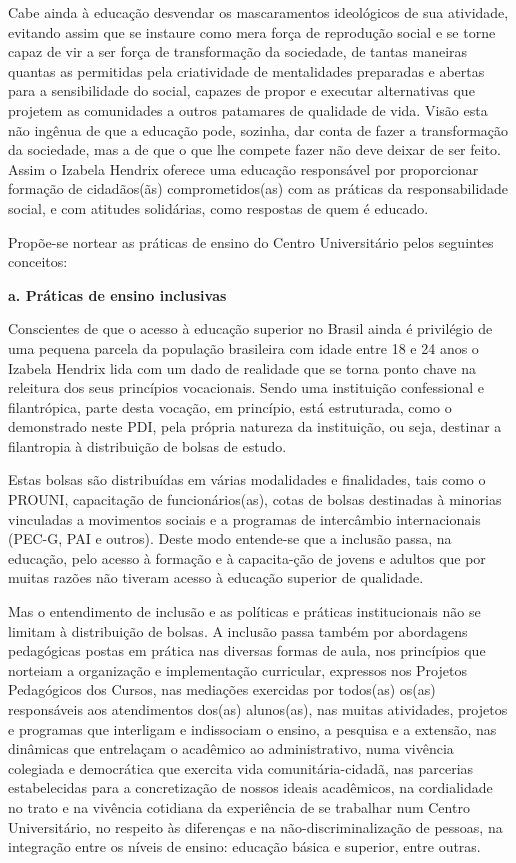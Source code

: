 \documentclass[a4paper, 12pt, openright, oneside, german, french, english, brazil]{abntex2}
\begin{document}
Cabe ainda à educação desvendar os mascaramentos ideológicos de sua atividade, evitando assim que se instaure como mera força de reprodução social e se torne capaz de vir a ser força de transformação da sociedade, de tantas maneiras quantas as permitidas pela criatividade de mentalidades preparadas e abertas para a sensibilidade do social, capazes de propor e executar alternativas que projetem as comunidades a outros patamares de qualidade de vida. Visão esta não ingênua de que a educação pode, sozinha, dar conta de fazer a transformação da sociedade, mas a de que o que lhe compete fazer não deve deixar de ser feito. Assim o Izabela Hendrix oferece uma educação responsável por proporcionar formação de cidadãos(ãs) comprometidos(as) com as práticas da responsabilidade social, e com atitudes solidárias, como respostas de quem é educado.

Propõe-se nortear as práticas de ensino do Centro Universitário pelos seguintes conceitos:

\textbf{a. Práticas de ensino inclusivas}

Conscientes de que o acesso à educação superior no Brasil ainda é privilégio de uma pequena parcela da população brasileira com idade entre 18 e 24 anos o Izabela Hendrix lida com um dado de realidade que se torna ponto chave na releitura dos seus princípios vocacionais. Sendo uma instituição confessional e filantrópica, parte desta vocação, em princípio, está estruturada, como o demonstrado neste PDI, pela própria natureza da instituição, ou seja, destinar a filantropia à distribuição de bolsas de estudo.

Estas bolsas são distribuídas em várias modalidades e finalidades, tais como o PROUNI, capacitação de funcionários(as), cotas de bolsas destinadas à minorias vinculadas a movimentos sociais e a programas de intercâmbio internacionais (PEC-G, PAI e outros). Deste modo entende-se que a inclusão passa, na educação, pelo acesso à formação e à capacita-ção de jovens e adultos que por muitas razões não tiveram acesso à educação superior de qualidade.

Mas o entendimento de inclusão e as políticas e práticas institucionais não se limitam à distribuição de bolsas. A inclusão passa também por abordagens pedagógicas postas em prática nas diversas formas de aula, nos princípios que norteiam a organização e implementação curricular, expressos nos Projetos Pedagógicos dos Cursos, nas mediações exercidas por todos(as) os(as) responsáveis aos atendimentos dos(as) alunos(as), nas muitas atividades, projetos e programas que interligam e indissociam o ensino, a pesquisa e a extensão, nas dinâmicas que entrelaçam o acadêmico ao administrativo, numa vivência colegiada e democrática que exercita vida comunitária-cidadã, nas parcerias estabelecidas para a concretização de nossos ideais acadêmicos, na cordialidade no trato e na vivência cotidiana da experiência de se trabalhar num Centro Universitário, no respeito às diferenças e na não-discriminalização de pessoas, na integração entre os níveis de ensino: educação básica e superior, entre outras.
\end{document}
